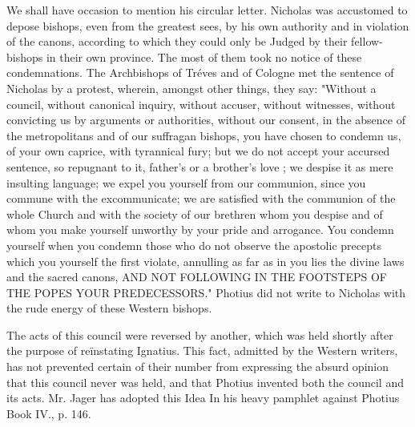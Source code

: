 We shall have occasion to mention his circular letter. Nicholas was accustomed to depose bishops, even from the greatest sees, by his own authority and in violation of the canons, according to which they could only be Judged by their fellow-bishops in their own province. The most of them took no notice of these condemnations. The Archbishops of Tréves and of Cologne met the sentence of Nicholas by a protest, wherein, amongst other things, they say: "Without a council, without canonical inquiry, without accuser, without witnesses, without convicting us by arguments or authorities, without our consent, in the absence of the metropolitans and of our suffragan bishops, you have chosen to condemn us, of your own caprice, with tyrannical fury; but we do not accept your accursed sentence, so repugnant to it, father's or a brother's love ; we despise it as mere insulting language; we expel you yourself from our communion, since you commune with the excommunicate; we are satisfied with the communion of the whole Church and with the society of our brethren whom you despise and of whom you make yourself unworthy by your pride and arrogance. You condemn yourself when you condemn those who do not observe the apostolic precepts which you yourself the first violate, annulling as far as in you lies the divine laws and the sacred canons, AND NOT FOLLOWING IN THE FOOTSTEPS OF THE POPES YOUR PREDECESSORS." Photius did not write to Nicholas with the rude energy of these Western bishops.

The acts of this council were reversed by another, which was held shortly after the purpose of reïnstating Ignatius. This fact, admitted by the Western writers, has not prevented certain of their number from expressing the absurd opinion that this council never was held, and that Photius invented both the council and its acts. Mr. Jager has adopted this Idea In his heavy pamphlet against Photius Book IV., p. 146.

